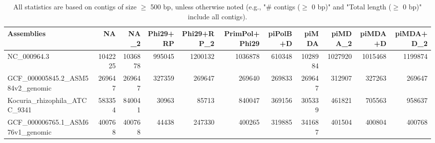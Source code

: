 \documentclass[12pt,a4paper]{article}
\begin{document}
\begin{table}[ht]
\begin{center}
\caption{All statistics are based on contigs of size $\geq$ 500 bp, unless otherwise noted (e.g., "\# contigs ($\geq$ 0 bp)" and "Total length ($\geq$ 0 bp)" include all contigs).}
\begin{tabular}{|l*{10}{|r}|}
\hline
Assemblies & NA & NA\_2 & Phi29+RP & Phi29+RP\_2 & PrimPol+Phi29 & piPolB+D & piMDA & piMDA\_2 & piMDA+D & piMDA+D\_2 \\ \hline
NC\_000964.3 & 1042225 & 1036878 & 995045 & 1200132 & 1036878 & 610348 & 1028984 & 1027920 & 1015468 & 1199874 \\ \hline
GCF\_000005845.2\_ASM584v2\_genomic & 269647 & 269647 & 327359 & 269647 & 269640 & 269833 & 269647 & 312907 & 327263 & 269647 \\ \hline
Kocuria\_rhizophila\_ATCC\_9341 & 583354 & 840041 & 30963 & 85713 & 840047 & 369156 & 305339 & 461821 & 705563 & 958637 \\ \hline
GCF\_000006765.1\_ASM676v1\_genomic & 400768 & 400768 & 44438 & 247330 & 400265 & 319885 & 341687 & 401504 & 400804 & 400768 \\ \hline
\end{tabular}
\end{center}
\end{table}
\end{document}
